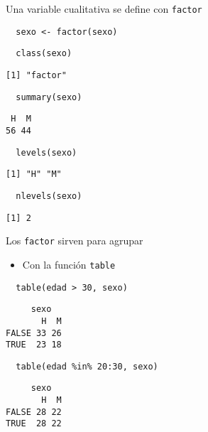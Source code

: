 \documentclass[xcolor={usenames,svgnames,dvipsnames}]{beamer}
\begin{document}
\begin{frame}[fragile,label={sec:org6c4d0a8}]{Una variable cualitativa se define con \texttt{factor}}
 \lstset{language=r,label= ,caption= ,captionpos=b,numbers=none}
\begin{lstlisting}
  sexo <- factor(sexo)
\end{lstlisting}

\lstset{language=r,label= ,caption= ,captionpos=b,numbers=none}
\begin{lstlisting}
  class(sexo)
\end{lstlisting}

\begin{verbatim}
[1] "factor"
\end{verbatim}

\lstset{language=r,label= ,caption= ,captionpos=b,numbers=none}
\begin{lstlisting}
  summary(sexo)
\end{lstlisting}

\begin{verbatim}
 H  M 
56 44
\end{verbatim}

\lstset{language=r,label= ,caption= ,captionpos=b,numbers=none}
\begin{lstlisting}
  levels(sexo)
\end{lstlisting}

\begin{verbatim}
[1] "H" "M"
\end{verbatim}

\lstset{language=r,label= ,caption= ,captionpos=b,numbers=none}
\begin{lstlisting}
  nlevels(sexo)
\end{lstlisting}

\begin{verbatim}
[1] 2
\end{verbatim}
\end{frame}

\begin{frame}[fragile,label={sec:org08bd5e7}]{Los \texttt{factor} sirven para agrupar}
 \begin{itemize}
\item Con la función \texttt{table}
\end{itemize}
\lstset{language=r,label= ,caption= ,captionpos=b,numbers=none}
\begin{lstlisting}
  table(edad > 30, sexo)
\end{lstlisting}

\begin{verbatim}
     sexo
       H  M
FALSE 33 26
TRUE  23 18
\end{verbatim}

\lstset{language=r,label= ,caption= ,captionpos=b,numbers=none}
\begin{lstlisting}
  table(edad %in% 20:30, sexo)
\end{lstlisting}

\begin{verbatim}
     sexo
       H  M
FALSE 28 22
TRUE  28 22
\end{verbatim}
\end{frame}
\end{document}
